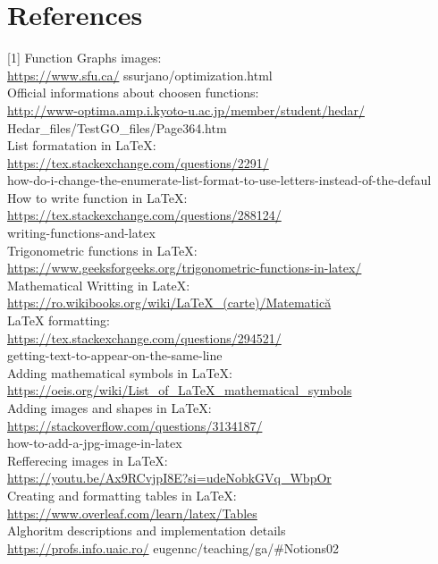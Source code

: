 \documentclass[10pt]{article}
\begin{document}
\section*{References}
[1] Function Graphs images:\\
\href{https://www.sfu.ca/}{https://www.sfu.ca/} ssurjano/optimization.html\\
[2] Official informations about choosen functions:\\
\href{http://www-optima.amp.i.kyoto-u.ac.jp/member/student/hedar/}{http://www-optima.amp.i.kyoto-u.ac.jp/member/student/hedar/}\\
Hedar\_files/TestGO\_files/Page364.htm\\
[3] List formatation in LaTeX:\\
\href{https://tex.stackexchange.com/questions/2291/}{https://tex.stackexchange.com/questions/2291/}\\
how-do-i-change-the-enumerate-list-format-to-use-letters-instead-of-the-defaul\\
[4] How to write function in LaTeX:\\
\href{https://tex.stackexchange.com/questions/288124/}{https://tex.stackexchange.com/questions/288124/}\\
writing-functions-and-latex\\
[5] Trigonometric functions in LaTeX:\\
\href{https://www.geeksforgeeks.org/trigonometric-functions-in-latex/}{https://www.geeksforgeeks.org/trigonometric-functions-in-latex/}\\
[6] Mathematical Writting in LateX:\\
\href{https://ro.wikibooks.org/wiki/LaTeX_(carte)/Matematic%C4%83}{https://ro.wikibooks.org/wiki/LaTeX\_(carte)/Matematică}\\
[7] LaTeX formatting:\\
\href{https://tex.stackexchange.com/questions/294521/}{https://tex.stackexchange.com/questions/294521/}\\
getting-text-to-appear-on-the-same-line\\
[8] Adding mathematical symbols in LaTeX:\\
\href{https://oeis.org/wiki/List_of_LaTeX_mathematical_symbols}{https://oeis.org/wiki/List\_of\_LaTeX\_mathematical\_symbols}\\
[9] Adding images and shapes in LaTeX:\\
\href{https://stackoverflow.com/questions/3134187/}{https://stackoverflow.com/questions/3134187/}\\
how-to-add-a-jpg-image-in-latex\\
[10] Refferecing images in LaTeX:\\
\href{https://youtu.be/Ax9RCvjpI8E?si=udeNobkGVq_WbpOr}{https://youtu.be/Ax9RCvjpI8E?si=udeNobkGVq\_WbpOr}\\
[11] Creating and formatting tables in LaTeX:\\
\href{https://www.overleaf.com/learn/latex/Tables}{https://www.overleaf.com/learn/latex/Tables}\\
[12] Alghoritm descriptions and implementation details\\
\href{https://profs.info.uaic.ro/}{https://profs.info.uaic.ro/} eugennc/teaching/ga/\#Notions02
\end{document}
